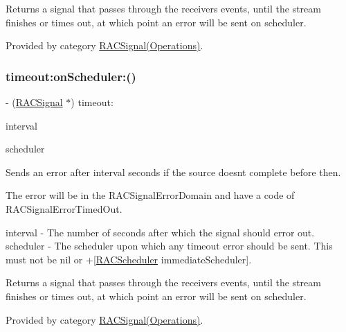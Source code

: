 Returns a signal that passes through the receiver\textquotesingle{}s events, until the stream finishes or times out, at which point an error will be sent on {\ttfamily scheduler}. 

Provided by category \mbox{\hyperlink{category_r_a_c_signal_07_operations_08_a8c5f03f4cc8a132e91a985f3d5ccebc0}{R\+A\+C\+Signal(\+Operations)}}.

\mbox{\label{interface_r_a_c_signal_a8c5f03f4cc8a132e91a985f3d5ccebc0}} 
\subsubsection{\texorpdfstring{timeout\+:on\+Scheduler\+:()}{timeout:onScheduler:()}\hspace{0.1cm}{\footnotesize\ttfamily [3/3]}}
{\footnotesize\ttfamily -\/ (\mbox{\hyperlink{interface_r_a_c_signal}{R\+A\+C\+Signal}} $\ast$) timeout\+: \begin{DoxyParamCaption}\item[{(N\+S\+Time\+Interval)}]{interval }\item[{onScheduler:(\mbox{\hyperlink{interface_r_a_c_scheduler}{R\+A\+C\+Scheduler}} $\ast$)}]{scheduler }\end{DoxyParamCaption}}

Sends an error after {\ttfamily interval} seconds if the source doesn\textquotesingle{}t complete before then.

The error will be in the R\+A\+C\+Signal\+Error\+Domain and have a code of R\+A\+C\+Signal\+Error\+Timed\+Out.

interval -\/ The number of seconds after which the signal should error out. scheduler -\/ The scheduler upon which any timeout error should be sent. This must not be nil or +\mbox{[}\mbox{\hyperlink{interface_r_a_c_scheduler}{R\+A\+C\+Scheduler}} immediate\+Scheduler\mbox{]}.

Returns a signal that passes through the receiver\textquotesingle{}s events, until the stream finishes or times out, at which point an error will be sent on {\ttfamily scheduler}. 

Provided by category \mbox{\hyperlink{category_r_a_c_signal_07_operations_08_a8c5f03f4cc8a132e91a985f3d5ccebc0}{R\+A\+C\+Signal(\+Operations)}}.

